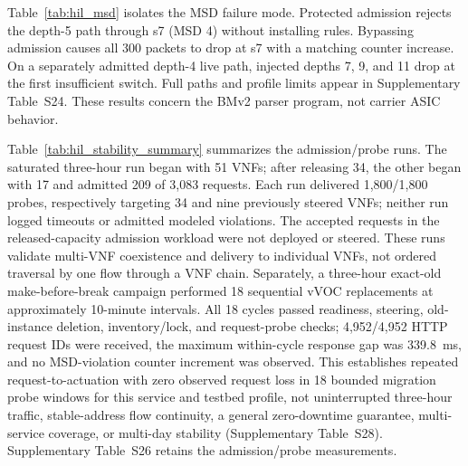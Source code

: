 \documentclass[final,5p]{elsarticle}
\newcommand{\rev}[1]{\textcolor{revisiongreen}{#1}}
\let\newrev\rev
\begin{document}
\newrev{Table~\ref{tab:hil_msd} isolates the MSD failure mode. Protected admission rejects the depth-5 path through s7 (MSD 4) without installing rules. Bypassing admission causes all 300 packets to drop at s7 with a matching counter increase. On a separately admitted depth-4 live path, injected depths 7, 9, and 11 drop at the first insufficient switch. Full paths and profile limits appear in Supplementary Table~S24. These results concern the BMv2 parser program, not carrier ASIC behavior.}

\begin{table}[t]
\centering
\caption{\newrev{BMv2 MSD fault tests. Isolated rows aggregate three 100-packet trials; live rows use 50 packets per depth. Counter gives the MSD-drop increment.}}
\label{tab:hil_msd}
{\color{revisiongreen}\scriptsize
\setlength{\tabcolsep}{3pt}
}
\end{table}

\newrev{Table~\ref{tab:hil_stability_summary} summarizes the admission/probe runs. The saturated three-hour run began with 51 VNFs; after releasing 34, the other began with 17 and admitted 209 of 3,083 requests. Each run delivered 1,800/1,800 probes, respectively targeting 34 and nine previously steered VNFs; neither run logged timeouts or admitted modeled violations. The accepted requests in the released-capacity admission workload were not deployed or steered. These runs validate multi-VNF coexistence and delivery to individual VNFs, not ordered traversal by one flow through a VNF chain. Separately, a three-hour exact-old make-before-break campaign performed 18 sequential vVOC replacements at approximately 10-minute intervals. All 18 cycles passed readiness, steering, old-instance deletion, inventory/lock, and request-probe checks; 4,952/4,952 HTTP request IDs were received, the maximum within-cycle response gap was 339.8~ms, and no MSD-violation counter increment was observed. This establishes repeated request-to-actuation with zero observed request loss in 18 bounded migration probe windows for this service and testbed profile, not uninterrupted three-hour traffic, stable-address flow continuity, a general zero-downtime guarantee, multi-service coverage, or multi-day stability (Supplementary Table~S28). Supplementary Table~S26 retains the admission/probe measurements.}
\end{document}
